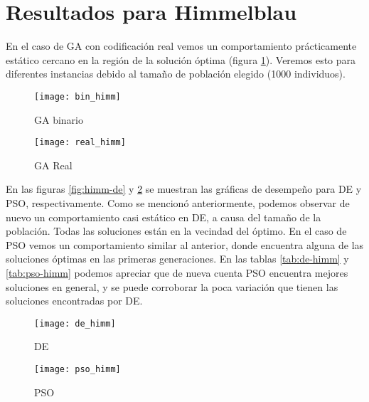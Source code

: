 \documentclass[letterpaper,12pt]{article}
\theoremstyle{definition}
\begin{document}
\section{Resultados para Himmelblau}

En el caso de GA con codificación real vemos un comportamiento prácticamente estático cercano en la región de la solución óptima (figura \ref{fig:ga-himm2}). Veremos esto para diferentes instancias debido al tamaño de población elegido (1000 individuos). 

\begin{figure}[!h]
      \texttt{[image: bin\_himm]}
      \caption{GA binario}
      \label{fig:ga-himm1}
    \endminipage\hfill
      \texttt{[image: real\_himm]}
      \caption{GA Real}
      \label{fig:ga-himm2}
    \endminipage\hfill
 \end{figure}



En las figuras \ref{fig:himm-de} y \ref{fig:himm-pso} se muestran las gráficas de desempeño para DE y PSO, respectivamente. Como se mencionó anteriormente, podemos observar de nuevo un comportamiento casi estático en DE, a causa del tamaño de la población. Todas las soluciones están en la vecindad del óptimo. En el caso de PSO vemos un comportamiento similar al anterior, donde encuentra alguna de las soluciones óptimas en las primeras generaciones. En las tablas \ref{tab:de-himm} y \ref{tab:pso-himm} podemos apreciar que de nueva cuenta PSO encuentra mejores soluciones en general, y se puede corroborar la poca variación que tienen las soluciones encontradas por DE.

\begin{figure}[!htb]
      \texttt{[image: de\_himm]}
      \caption{DE}
      \label{fig:himm-de}
    \endminipage\hfill
      \texttt{[image: pso\_himm]}
      \caption{PSO}
      \label{fig:himm-pso}
    \endminipage\hfill
    
 \end{figure}
\end{document}
